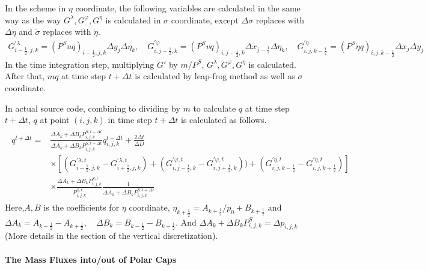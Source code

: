 In the scheme in \(\eta\) coordinate, the following variables are calculated in the same way as the way \(G^{\lambda}, G^{\varphi}, G^{\eta}\) is calculated in \(\sigma\) coordinate, except
\(\Delta \sigma\) replaces with \(\Delta \eta\) and \(\dot{\sigma}\) replaces with \(\dot{\eta}\).
\begin{eqnarray}G^{\prime \lambda}_{i-\frac{1}{2},j,k}=(P^{S}uq)_{i-\frac{1}{2},j,k} \Delta y_{j} \Delta \eta_{k},\quad G^{\prime \varphi}_{i,j-\frac{1}{2},k}=(P^{S}vq)_{i,j-\frac{1}{2},k} \Delta x_{j-\frac{1}{2}} \Delta \eta_{k},\quad G^{\prime \eta}_{i,j,k-\frac{1}{2}}=(P^{S} \dot{\eta} q)_{i,j,k-\frac{1}{2}} \Delta x_{j} \Delta y_{j}\end{eqnarray}
In the time integration step, multiplying \(G\prime\) by \(m/P^{S}\), \(G^{\lambda}, G^{\varphi}, G^{\eta}\) is calculated. After that, \(mq\) at time step \(t+\Delta t\) is calculated by leap-frog
method as well as \(\sigma\) coordinate.

In actual source code, combining to dividing by \(m\) to calculate \(q\) at time step \(t+\Delta t\), \(q\) at point \((i,j,k)\) in time step \(t+\Delta t\) is calculated as follows. \begin{eqnarray}\begin{aligned}
q^{t+\Delta t}=&\frac{\Delta A_{k}+\Delta B_{k} P^{S,t-\Delta t}_{i,j,k}}{\Delta A_{k}+\Delta B_{k} P^{S,t+\Delta t}_{i,j,k}}q^{t-\Delta t}_{i,j,k}+\frac{2\Delta t}{\Delta D}\\
&\times [(G^{\prime \lambda,t}_{i-\frac{1}{2},j,k}-G^{\prime \lambda,t}_{i+\frac{1}{2},j,k})+(G^{\prime \varphi,t}_{i,j-\frac{1}{2},k}-G^{\prime \varphi,t}_{i,j+\frac{1}{2},k}))+(G^{\prime \eta,t}_{i,j,k-\frac{1}{2}}-G^{\prime \eta,t}_{i,j,k+\frac{1}{2}})]\\
&\times \frac{\Delta A_{k}+\Delta B_{k} P^{S,t}_{i,j,k}}{P^{S,t}_{i,j,k}}\frac{1}{\Delta A_{k}+\Delta B_{k} P^{S,t+\Delta t}_{i,j,k}}
\end{aligned}
\end{eqnarray} Here,\(A,B\) is the coefficients for \(\eta\) coordinate, \(\eta_{k+\frac{1}{2}}=A_{k+\frac{1}{2}}/p_{0}+B_{k+\frac{1}{2}}\) and
\(\Delta A_{k}=A_{k-\frac{1}{2}}-A_{k+\frac{1}{2}},\quad \Delta B_{k}=B_{k-\frac{1}{2}}-B_{k+\frac{1}{2}}\). And \(\Delta A_{k}+\Delta B_{k} P^{S}_{i,j,k}=\Delta p_{i,j,k}\)(More details in the
section of the vertical discretization).

\hypertarget{the-mass-fluxes-intoout-of-polar-caps}{%
\paragraph{The Mass Fluxes into/out of Polar Caps}\label{the-mass-fluxes-intoout-of-polar-caps}}

